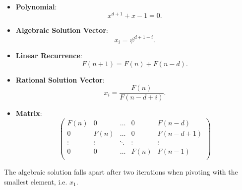 \begin{itemize}
  \item \textbf{Polynomial}: \[x^{d+1} + x - 1 = 0.\]
  \item \textbf{Algebraic Solution Vector}: \[x_i = \psi^{d+1-i}.\]
  \item \textbf{Linear Recurrence}: \[F(n + 1) = F(n) + F(n - d).\]
  \item \textbf{Rational Solution Vector}: \[x_i = \frac{F(n)}{F(n-d+i)}.\]
  \item \textbf{Matrix}:
    \[\left(\begin{array}{cccc|c}
      F(n)   & 0      & \dots  & 0      & F(n - d) \\
        0    & F(n)   & \dots  & 0      & F(n - d + 1) \\
      \vdots & \vdots & \ddots & \vdots & \vdots   \\
        0    & 0      & \dots  & F(n)   & F(n - 1) \\
    \end{array}\right)\]
\end{itemize}

The algebraic solution falls apart after two iterations when pivoting with the
smallest element, i.e. $x_1$.

